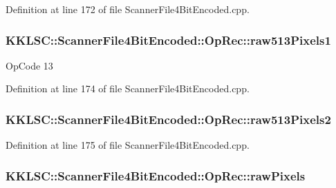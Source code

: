 Definition at line 172 of file Scanner\+File4\+Bit\+Encoded.\+cpp.

\subsubsection[{\texorpdfstring{raw513\+Pixels1}{raw513Pixels1}}]{ K\+K\+L\+S\+C\+::\+Scanner\+File4\+Bit\+Encoded\+::\+Op\+Rec\+::raw513\+Pixels1}\hypertarget{union_scanner_file4_bit_encoded_1_1_op_rec_ae7c501fc7a91ab17b857359a0b459cea}{}\label{union_scanner_file4_bit_encoded_1_1_op_rec_ae7c501fc7a91ab17b857359a0b459cea}
Op\+Code 13 

Definition at line 174 of file Scanner\+File4\+Bit\+Encoded.\+cpp.

\subsubsection[{\texorpdfstring{raw513\+Pixels2}{raw513Pixels2}}]{ K\+K\+L\+S\+C\+::\+Scanner\+File4\+Bit\+Encoded\+::\+Op\+Rec\+::raw513\+Pixels2}\hypertarget{union_scanner_file4_bit_encoded_1_1_op_rec_a78ccb14eccac6a9529b67e2d55dde837}{}\label{union_scanner_file4_bit_encoded_1_1_op_rec_a78ccb14eccac6a9529b67e2d55dde837}


Definition at line 175 of file Scanner\+File4\+Bit\+Encoded.\+cpp.

\subsubsection[{\texorpdfstring{raw\+Pixels}{rawPixels}}]{ K\+K\+L\+S\+C\+::\+Scanner\+File4\+Bit\+Encoded\+::\+Op\+Rec\+::raw\+Pixels}\hypertarget{union_scanner_file4_bit_encoded_1_1_op_rec_a06ecd8c4ba24c693e0fba9510aa16a39}{}\label{union_scanner_file4_bit_encoded_1_1_op_rec_a06ecd8c4ba24c693e0fba9510aa16a39}


